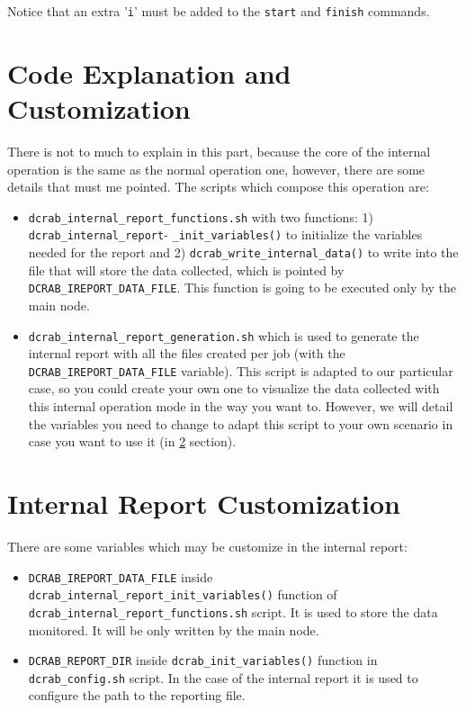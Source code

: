 \documentclass[10pt,a4paper]{report}
\begin{document}
Notice that an extra '\verb+i+' must be added to the \verb+start+ and \verb+finish+ commands.

\section{Code Explanation and Customization}

There is not to much to explain in this part, because the core of the internal operation is the same as the normal operation one, however, there are some details that must me pointed. The scripts which compose this operation are:

\begin{itemize}
  \item \texttt{dcrab\_internal\_report\_functions.sh} with two functions: 1) \texttt{dcrab\_internal\_report}- \texttt{\_init\_variables()} to initialize the variables needed for the report and 2) \texttt{dcrab\_write\_internal\_data()} to write into the file that will store the data collected, which is pointed by \verb+DCRAB_IREPORT_DATA_FILE+. This function is going to be executed only by the main node.
  \item \texttt{dcrab\_internal\_report\_generation.sh} which is used to generate the internal report with all the files created per job (with the \verb+DCRAB_IREPORT_DATA_FILE+ variable). This script is adapted to our particular case, so you could create your own one to visualize the data collected with this internal operation mode in the way you want to. However, we will detail the variables you need to change to adapt this script to your own scenario in case you want to use it (in \ref{internalReportCustomization} section).
\end{itemize}

\section{Internal Report Customization}
\label{internalReportCustomization}

There are some variables which may be customize in the internal report:

\begin{itemize}
  \item \texttt{DCRAB\_IREPORT\_DATA\_FILE} inside \texttt{dcrab\_internal\_report\_init\_variables()} function of \verb+dcrab_internal_report_functions.sh+ script. It is used to store the data monitored. It will be only written by the main node.
  \item \texttt{DCRAB\_REPORT\_DIR} inside \texttt{dcrab\_init\_variables()} function in \verb+dcrab_config.sh+ script. In the case of the internal report it is used to configure the path to the reporting file.
\end{itemize}
\end{document}
